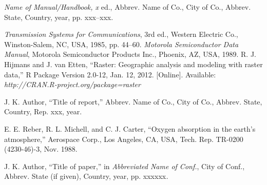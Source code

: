 \documentclass{IEEEtaes}
\begin{document}
\vspace*{-12pt}
\begin{thebibliography}{[34A]}
\item[]  \emph{Name of Manual/Handbook, x} ed., Abbrev. Name of Co., City of Co., Abbrev. State, Country, year, pp. xxx--xxx.
\end{thebibliography}

\vspace*{-12pt}
\begin{thebibliography}{[31d]}
\setcounter{enumiv}{9}
\emph{Transmission Systems for Communications}, 3rd ed., Western Electric Co., Winston-Salem, NC, USA, 1985, pp. 44--60.
\emph{Motorola Semiconductor Data Manual}, Motorola Semiconductor Products Inc., Phoenix, AZ, USA, 1989.
R. J. Hijmans and J. van Etten, ``Raster: Geographic analysis and modeling with raster data,'' R Package Version 2.0-12, Jan. 12, 2012. {[}Online{]}. Available: \emph{http://CRAN.R-project.org/package=raster}
\end{thebibliography}

\vspace*{-12pt}

\begin{thebibliography}{[31d]}
\item[]  J. K. Author, ``Title of report,'' Abbrev. Name of Co., City of Co., Abbrev. State, Country, Rep. xxx, year.
\end{thebibliography}

\vspace*{-12pt}
\begin{thebibliography}{[31d]}
\setcounter{enumiv}{12}
E. E. Reber, R. L. Michell, and C. J. Carter, ``Oxygen absorption in the earth's atmosphere,'' Aerospace Corp., Los Angeles, CA, USA, Tech. Rep. TR-0200 (4230-46)-3, Nov. 1988.
\end{thebibliography}

\vspace*{-12pt}
\begin{thebibliography}{[31d]}
\item[] J. K. Author, ``Title of paper,'' in \emph{Abbreviated Name of Conf.}, City of Conf., Abbrev. State (if given), Country, year, pp. xxxxxx\emph{.}
\end{thebibliography}
\end{document}
